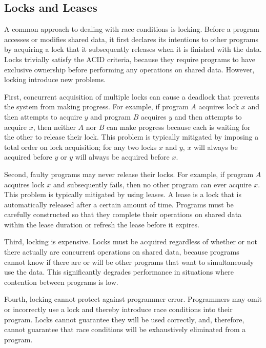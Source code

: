 \documentclass[../main.tex]{subfiles}
\begin{document}
  \subsection{Locks and Leases}
  A common approach to dealing with race conditions is locking. Before a program accesses or
  modifies shared data, it first declares its intentions to other programs by acquiring a
  lock that it subsequently releases when it is finished with the data. Locks trivially satisfy
  the ACID criteria, because they require programs to have exclusive ownership before performing any
  operations on shared data. However, locking introduce new problems.

  First, concurrent acquisition of multiple locks can cause a deadlock that prevents the system from
  making progress. For example, if program $A$ acquires lock $x$ and then attempts to acquire $y$
  and program $B$ acquires $y$ and then attempts to acquire $x$, then neither $A$ nor $B$ can make
  progress because each is waiting for the other to release their lock. This problem is typically
  mitigated by imposing a total order on lock acquisition; for any two locks $x$ and $y$, $x$ will
  always be acquired before $y$ or $y$ will always be acquired before $x$.

  Second, faulty programs may never release their locks. For example, if program $A$ acquires lock
  $x$ and subsequently fails, then no other program can ever acquire $x$. This problem is typically
  mitigated by using leases. \cite{leases} A lease is a lock that is automatically released after a
  certain amount of time. Programs must be carefully constructed so that they complete their
  operations on shared data within the lease duration or refresh the lease before it expires.

  Third, locking is expensive. Locks must be acquired regardless of whether or not there actually
  are concurrent operations on shared data, because programs cannot know if there are or will be
  other programs that want to simultaneously use the data. This significantly degrades
  performance in situations where contention between programs is low.

  Fourth, locking cannot protect against programmer error. Programmers may omit or incorrectly use a
  lock and thereby introduce race conditions into their program. Locks cannot guarantee they will be
  used correctly, and, therefore, cannot guarantee that race conditions will be exhaustively
  eliminated from a program.
\end{document}
